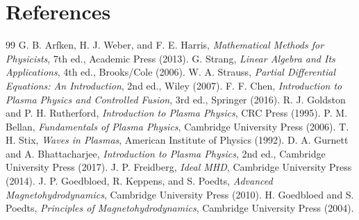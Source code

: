 \documentclass[11pt]{article}
\begin{document}
\section{References}
\begin{thebibliography}{99}
 G. B. Arfken, H. J. Weber, and F. E. Harris, \emph{Mathematical Methods for Physicists}, 7th ed., Academic Press (2013).
 G. Strang, \emph{Linear Algebra and Its Applications}, 4th ed., Brooks/Cole (2006).
 W. A. Strauss, \emph{Partial Differential Equations: An Introduction}, 2nd ed., Wiley (2007).
 F. F. Chen, \emph{Introduction to Plasma Physics and Controlled Fusion}, 3rd ed., Springer (2016).
 R. J. Goldston and P. H. Rutherford, \emph{Introduction to Plasma Physics}, CRC Press (1995).
 P. M. Bellan, \emph{Fundamentals of Plasma Physics}, Cambridge University Press (2006).
 T. H. Stix, \emph{Waves in Plasmas}, American Institute of Physics (1992).
 D. A. Gurnett and A. Bhattacharjee, \emph{Introduction to Plasma Physics}, 2nd ed., Cambridge University Press (2017).
 J. P. Freidberg, \emph{Ideal MHD}, Cambridge University Press (2014).
 J. P. Goedbloed, R. Keppens, and S. Poedts, \emph{Advanced Magnetohydrodynamics}, Cambridge University Press (2010).
 H. Goedbloed and S. Poedts, \emph{Principles of Magnetohydrodynamics}, Cambridge University Press (2004).
\end{thebibliography}
\end{document}
